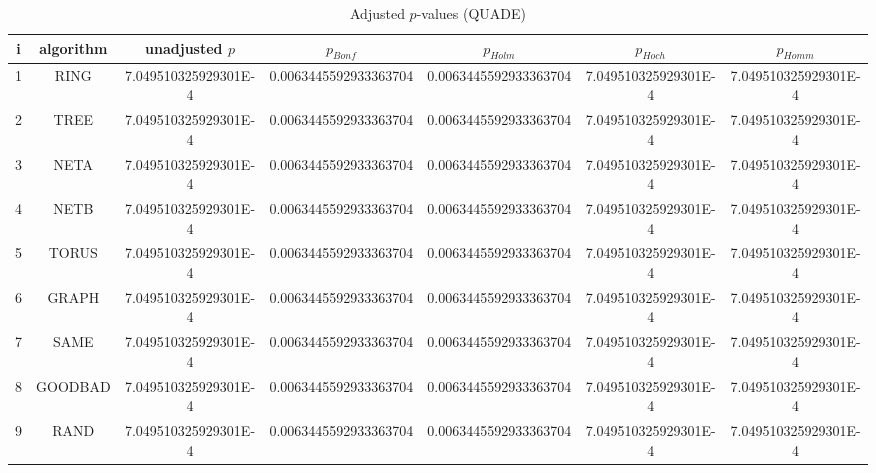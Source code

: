 \documentclass[a4paper,10pt]{article}
\begin{document}
\begin{landscape}
\begin{table}[!htp]
\centering\scriptsize
\caption{Adjusted $p$-values (QUADE)}
\begin{tabular}{ccccccc}
i&algorithm&unadjusted $p$&$p_{Bonf}$&$p_{Holm}$&$p_{Hoch}$&$p_{Homm}$\\
\hline
1& RING&7.049510325929301E-4&0.0063445592933363704&0.0063445592933363704&7.049510325929301E-4&7.049510325929301E-4\\
2& TREE&7.049510325929301E-4&0.0063445592933363704&0.0063445592933363704&7.049510325929301E-4&7.049510325929301E-4\\
3& NETA&7.049510325929301E-4&0.0063445592933363704&0.0063445592933363704&7.049510325929301E-4&7.049510325929301E-4\\
4& NETB&7.049510325929301E-4&0.0063445592933363704&0.0063445592933363704&7.049510325929301E-4&7.049510325929301E-4\\
5& TORUS&7.049510325929301E-4&0.0063445592933363704&0.0063445592933363704&7.049510325929301E-4&7.049510325929301E-4\\
6& GRAPH&7.049510325929301E-4&0.0063445592933363704&0.0063445592933363704&7.049510325929301E-4&7.049510325929301E-4\\
7& SAME&7.049510325929301E-4&0.0063445592933363704&0.0063445592933363704&7.049510325929301E-4&7.049510325929301E-4\\
8& GOODBAD&7.049510325929301E-4&0.0063445592933363704&0.0063445592933363704&7.049510325929301E-4&7.049510325929301E-4\\
9& RAND&7.049510325929301E-4&0.0063445592933363704&0.0063445592933363704&7.049510325929301E-4&7.049510325929301E-4\\
\hline
\end{tabular}
\end{table}


\end{landscape}
\end{document}
